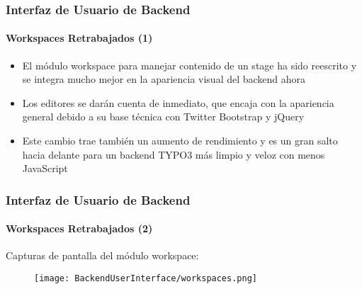 \begin{frame}[fragile]
	\frametitle{Interfaz de Usuario de Backend}
	\framesubtitle{Workspaces Retrabajados (1)}

	\begin{itemize}

		\item El módulo workspace para manejar contenido de un stage ha sido reescrito y
			se integra mucho mejor en la apariencia visual del backend ahora

		\item Los editores se darán cuenta de inmediato, que encaja con la apariencia general
			debido a su base técnica con Twitter Bootstrap y jQuery

		\item Este cambio trae también un aumento de rendimiento y es un gran salto hacia delante
			para un backend TYPO3 más limpio y veloz con menos JavaScript

	\end{itemize}

\end{frame}

\begin{frame}[fragile]
	\frametitle{Interfaz de Usuario de Backend}
	\framesubtitle{Workspaces Retrabajados (2)}

	Capturas de pantalla del módulo workspace:

	\begin{figure}
		\texttt{[image: BackendUserInterface/workspaces.png]}
	\end{figure}

\end{frame}


